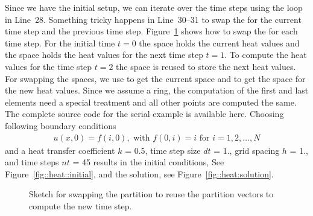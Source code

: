 Since we have the initial setup, we can iterate over the time steps using the  loop in Line~28. Something tricky happens in Line~30--31 to swap the  for the current time step and the previous time step. Figure~\ref{fig:heat:swap} shows how to swap the  for each time step. For the initial time $t=0$ the space  holds the current heat values and the space  holds the heat values for the next time step $t=1$. To compute the heat values for the time step $t=2$ the space  is reused to store the next heat values. For swapping the spaces, we use  to get the current space and  to get the space for the new heat values. Since we assume a ring, the computation of the first and last elements need a special treatment and all other points are computed the same. The complete source code for the serial example is available here. Choosing following boundary conditions 
\begin{align*}
u(x,0) = f(i,0), \text{ with } f(0,i)=i \text{ for } i=1,2,\ldots,N
\end{align*}
and a heat transfer coefficient $k$ = 0.5, time step size $dt$ = 1., grid spacing $h$ = 1., and time steps $nt$ = 45 results in the initial conditions, See Figure~\ref{fig::heat::initial}, and the solution, see Figure~\ref{fig::heat:solution}.

\begin{figure}[tb]
\centering
{}
\caption{Sketch for swapping the partition to reuse the partition vectors to compute the new time step.}
\label{fig:heat:swap}
\end{figure}


